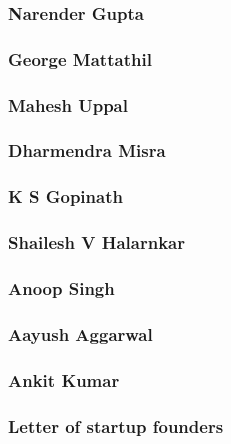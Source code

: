 \documentclass{article}
\begin{document}
\subsubsection{Narender Gupta}


\subsubsection{George Mattathil}


\subsubsection{Mahesh Uppal}


\subsubsection{Dharmendra Misra}


\subsubsection{K S Gopinath}


\subsubsection{Shailesh V Halarnkar}


\subsubsection{Anoop Singh}


\subsubsection{Aayush Aggarwal}


\subsubsection{Ankit Kumar}


\subsubsection{Letter of startup founders}

\end{document}
